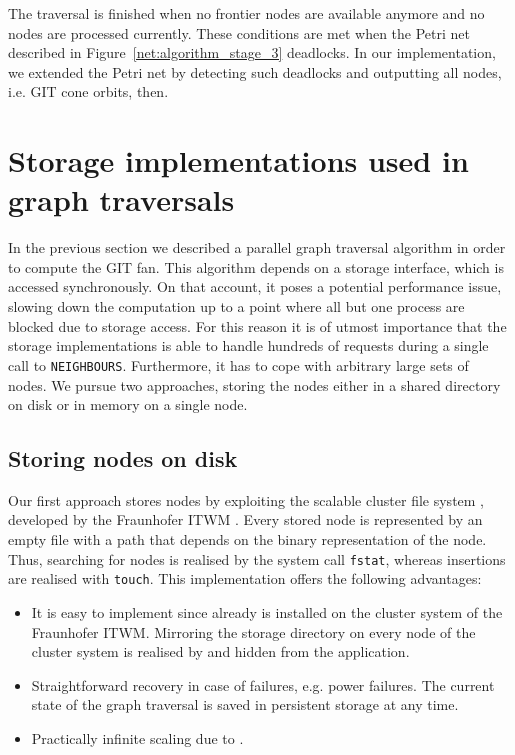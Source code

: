 The traversal is finished when no frontier nodes are available anymore and no nodes are processed currently. These conditions are met when the Petri net described in Figure~\ref{net:algorithm_stage_3} deadlocks. In our implementation, we extended the Petri net by detecting such deadlocks and outputting all nodes, i.e. GIT cone orbits, then.

\section{Storage implementations used in graph traversals}
\label{sec:storage_implementations}

In the previous section we described a parallel graph traversal algorithm in order to compute the GIT fan. This algorithm depends on a storage interface, which is accessed synchronously. On that account, it poses a potential performance issue, slowing down the computation up to a point where all but one process are blocked due to storage access. For this reason it is of utmost importance that the storage implementations is able to handle hundreds of requests during a single call to \texttt{NEIGHBOURS}. Furthermore, it has to cope with arbitrary large sets of nodes. We pursue two approaches, storing the nodes either in a shared directory on disk or in memory on a single node.

\subsection{Storing nodes on disk}

Our first approach stores nodes by exploiting the scalable cluster file system \beegfs{}, developed by the \ac{Fraunhofer ITWM} \cite{beegfs}. Every stored node is represented by an empty file with a path that depends on the binary representation of the node. Thus, searching for nodes is realised by the system call \texttt{fstat}, whereas insertions are realised with \texttt{touch}. This implementation offers the following advantages:

\begin{itemize}
	\item It is easy to implement since \beegfs{} already is installed on the cluster system of the \ac{Fraunhofer ITWM}. Mirroring the storage directory on every node of the cluster system is realised by \beegfs{} and hidden from the application.
	\item Straightforward recovery in case of failures, e.g. power failures. The current state of the graph traversal is saved in persistent storage at any time.
	\item Practically infinite scaling due to \beegfs{}.
\end{itemize}

